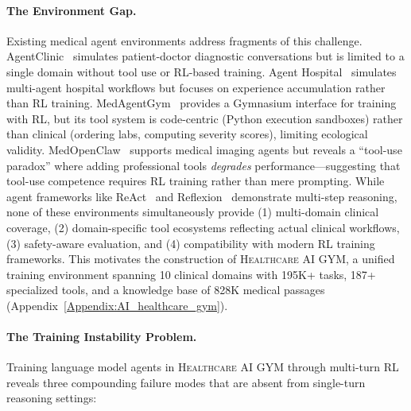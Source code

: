 \documentclass{article}
\newcommand{\gym}{\textsc{Healthcare AI GYM}}
\begin{document}
\paragraph{The Environment Gap.}
Existing medical agent environments address fragments of this challenge. AgentClinic~\citep{schmidgall2025agentclinic} simulates patient-doctor diagnostic conversations but is limited to a single domain without tool use or RL-based training. Agent Hospital~\citep{li2024agenthospital} simulates multi-agent hospital workflows but focuses on experience accumulation rather than RL training. MedAgentGym~\citep{medagentgym2026} provides a Gymnasium interface for training with RL, but its tool system is code-centric (Python execution sandboxes) rather than clinical (ordering labs, computing severity scores), limiting ecological validity. MedOpenClaw~\citep{shen2025medopenclaw} supports medical imaging agents but reveals a ``tool-use paradox'' where adding professional tools \emph{degrades} performance---suggesting that tool-use competence requires RL training rather than mere prompting. While agent frameworks like ReAct~\citep{yao2023react} and Reflexion~\citep{shinn2023reflexion} demonstrate multi-step reasoning, none of these environments simultaneously provide (1) multi-domain clinical coverage, (2) domain-specific tool ecosystems reflecting actual clinical workflows, (3) safety-aware evaluation, and (4) compatibility with modern RL training frameworks. This motivates the construction of \gym{}, a unified training environment spanning 10 clinical domains with 195K+ tasks, 187+ specialized tools, and a knowledge base of 828K medical passages (Appendix~\ref{Appendix:AI_healthcare_gym}).

\paragraph{The Training Instability Problem.}
Training language model agents in \gym{} through multi-turn RL reveals three compounding failure modes that are absent from single-turn reasoning settings:
\end{document}
